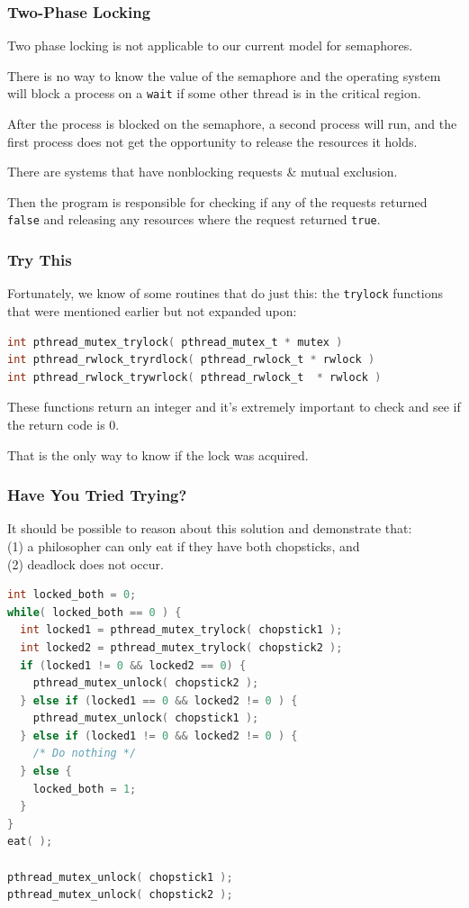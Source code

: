 \begin{frame}
	\frametitle{Two-Phase Locking}

	Two phase locking is not applicable to our current model for semaphores.

	There is no way to know the value of the semaphore and the operating system will block a process on a \texttt{wait} if some other thread is in the critical region.

	After the process is blocked on the semaphore, a second process will run, and the first process does not get the opportunity to release the resources it holds.

	There are systems that have nonblocking requests \& mutual exclusion.

	Then the program is responsible for checking if any of the requests returned \texttt{false} and releasing any resources where the request returned \texttt{true}.


\end{frame}


\begin{frame}[fragile]
	\frametitle{Try This}
	Fortunately, we know of some routines that do just this: the \texttt{trylock} functions that were mentioned earlier but not expanded upon:
	\begin{lstlisting}[language=C]
int pthread_mutex_trylock( pthread_mutex_t * mutex )
int pthread_rwlock_tryrdlock( pthread_rwlock_t * rwlock )
int pthread_rwlock_trywrlock( pthread_rwlock_t  * rwlock )
\end{lstlisting}

	These functions return an integer and it's extremely important to check and see if the return code is 0.

	That is the only way to know if the lock was acquired.

\end{frame}


\begin{frame}[fragile]
	\frametitle{Have You Tried Trying?}

	It should be possible to reason about this solution and demonstrate that:\\
	\quad (1) a philosopher can only eat if they have both chopsticks, and\\
	\quad (2) deadlock does not occur.

	\begin{lstlisting}[language=C]
int locked_both = 0;
while( locked_both == 0 ) {
  int locked1 = pthread_mutex_trylock( chopstick1 );
  int locked2 = pthread_mutex_trylock( chopstick2 );
  if (locked1 != 0 && locked2 == 0) {
    pthread_mutex_unlock( chopstick2 );
  } else if (locked1 == 0 && locked2 != 0 ) {
    pthread_mutex_unlock( chopstick1 );
  } else if (locked1 != 0 && locked2 != 0 ) {
    /* Do nothing */
  } else {
    locked_both = 1;
  }
}
eat( );

pthread_mutex_unlock( chopstick1 );
pthread_mutex_unlock( chopstick2 );
\end{lstlisting}

\end{frame}



